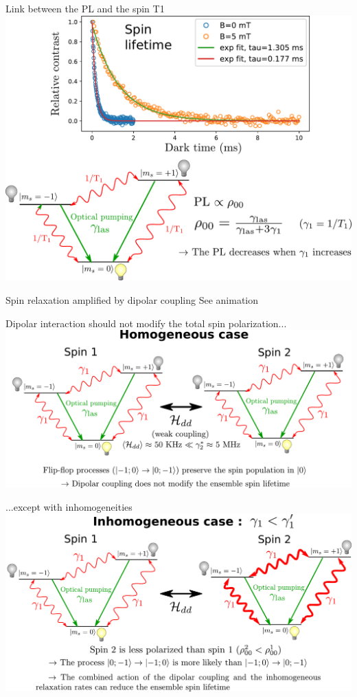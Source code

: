\documentclass{beamer}
\begin{document}
\begin{frame}{Link between the PL and the spin T1}
\centering
\includegraphics[width=\textwidth,height=0.9\textheight,keepaspectratio]{Explication T1 PL}
\end{frame}
\begin{frame}{Spin relaxation amplified by dipolar coupling}
See animation
\end{frame}
\begin{frame}{Dipolar interaction should not modify the total spin polarization...}
\centering
\includegraphics[width=\textwidth,height=0.9\textheight,keepaspectratio]{Flip flop inhomogénités}
\end{frame}
\begin{frame}{...except with inhomogeneities }
\centering
\includegraphics[width=\textwidth,height=0.9\textheight,keepaspectratio]{Flip flop inhomogénités 2}
\end{frame}
\end{document}
